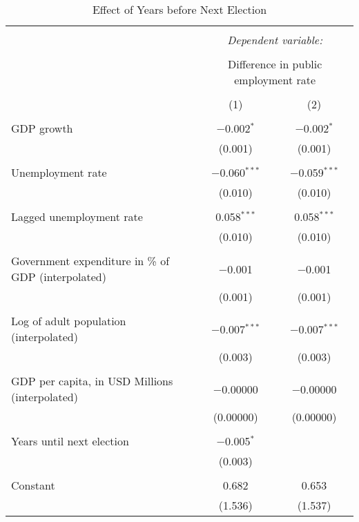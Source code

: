 
\begin{table}[!htbp] \centering 
  \caption{Effect of Years before Next Election} 
  \label{} 
\begin{tabular}{@{\extracolsep{5pt}}lcc} 
\\[-1.8ex]\hline 
\hline \\[-1.8ex] 
 & \multicolumn{2}{c}{\textit{Dependent variable:}} \\ 
\cline{2-3} 
\\[-1.8ex] & \multicolumn{2}{c}{Difference in public employment rate} \\ 
\\[-1.8ex] & (1) & (2)\\ 
\hline \\[-1.8ex] 
 GDP growth & $-$0.002$^{*}$ & $-$0.002$^{*}$ \\ 
  & (0.001) & (0.001) \\ 
  & & \\ 
 Unemployment rate & $-$0.060$^{***}$ & $-$0.059$^{***}$ \\ 
  & (0.010) & (0.010) \\ 
  & & \\ 
 Lagged unemployment rate & 0.058$^{***}$ & 0.058$^{***}$ \\ 
  & (0.010) & (0.010) \\ 
  & & \\ 
 Government expenditure in \% of GDP (interpolated) & $-$0.001 & $-$0.001 \\ 
  & (0.001) & (0.001) \\ 
  & & \\ 
 Log of adult population (interpolated) & $-$0.007$^{***}$ & $-$0.007$^{***}$ \\ 
  & (0.003) & (0.003) \\ 
  & & \\ 
 GDP per capita, in USD Millions (interpolated) & $-$0.00000 & $-$0.00000 \\ 
  & (0.00000) & (0.00000) \\ 
  & & \\ 
 Years until next election & $-$0.005$^{*}$ &  \\ 
  & (0.003) &  \\ 
  & & \\ 
 Constant & 0.682 & 0.653 \\ 
  & (1.536) & (1.537) \\ 

\end{tabular}
\end{table}
